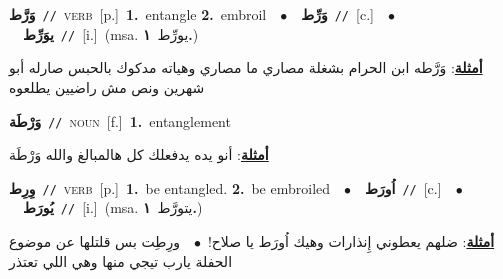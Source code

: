 \documentclass[10pt,a4paper,twoside]{article} %
\begin{document}
\begin{multicols}{2}
{\setlength\topsep{0pt}\textbf{\foreignlanguage{arabic}{وَرَّط}}\ {\color{gray}\texttt{//}\color{black}}\ \textsc{verb}\ [p.]\ \textbf{1.}~entangle  \textbf{2.}~embroil\ \ $\bullet$\ \ \setlength\topsep{0pt}\textbf{\foreignlanguage{arabic}{وَرِّط}}\ {\color{gray}\texttt{//}\color{black}}\ [c.]\ \ $\bullet$\ \ \setlength\topsep{0pt}\textbf{\foreignlanguage{arabic}{يوَرِّط}}\ {\color{gray}\texttt{//}\color{black}}\ [i.]\ \color{gray}(msa. \foreignlanguage{arabic}{يورِّط}~\foreignlanguage{arabic}{\textbf{١.}})\color{black}\  \begin{flushright}\color{gray}\foreignlanguage{arabic}{\textbf{\underline{\foreignlanguage{arabic}{أمثلة}}}: وَرَّطه ابن الحرام بشغلة مصاري ما مصاري وهياته مدكوك بالحبس صارله أبو شهرين ونص مش راضيين يطلعوه}\end{flushright}\color{black}} \vspace{2mm}

{\setlength\topsep{0pt}\textbf{\foreignlanguage{arabic}{وَرْطَة}}\ {\color{gray}\texttt{//}\color{black}}\ \textsc{noun}\ [f.]\ \textbf{1.}~entanglement\  \begin{flushright}\color{gray}\foreignlanguage{arabic}{\textbf{\underline{\foreignlanguage{arabic}{أمثلة}}}: أنو يده يدفعلك كل هالمبالغ والله وَرْطَة}\end{flushright}\color{black}} \vspace{2mm}

{\setlength\topsep{0pt}\textbf{\foreignlanguage{arabic}{وِرِط}}\ {\color{gray}\texttt{//}\color{black}}\ \textsc{verb}\ [p.]\ \textbf{1.}~be entangled.  \textbf{2.}~be embroiled\ \ $\bullet$\ \ \setlength\topsep{0pt}\textbf{\foreignlanguage{arabic}{اُورَط}}\ {\color{gray}\texttt{//}\color{black}}\ [c.]\ \ $\bullet$\ \ \setlength\topsep{0pt}\textbf{\foreignlanguage{arabic}{يُورَط}}\ {\color{gray}\texttt{//}\color{black}}\ [i.]\ \color{gray}(msa. \foreignlanguage{arabic}{يتورَّط}~\foreignlanguage{arabic}{\textbf{١.}})\color{black}\  \begin{flushright}\color{gray}\foreignlanguage{arabic}{\textbf{\underline{\foreignlanguage{arabic}{أمثلة}}}: ضلهم يعطوني إِنذارات وهيك اُورَط يا صلاح!\ $\bullet$\ \  ورِطِت بس قلتلها عن موضوع الحفلة يارب تيجي منها وهي اللي تعتذر}\end{flushright}\color{black}} \vspace{2mm}


\end{multicols}
\end{document}
